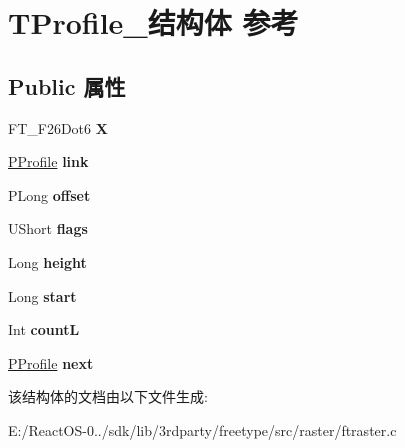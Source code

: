 \hypertarget{struct_t_profile__}{}\section{T\+Profile\+\_\+结构体 参考}
\label{struct_t_profile__}
\subsection*{Public 属性}
\begin{DoxyCompactItemize}
\item 
\mbox{\label{struct_t_profile___a60a3afad98842d916f4f1f4ce9817c9b}} 
F\+T\+\_\+\+F26\+Dot6 {\bfseries X}
\item 
\mbox{\label{struct_t_profile___ada0025f5d3e2dc41f1532f12d876e527}} 
\hyperlink{struct_t_profile__}{P\+Profile} {\bfseries link}
\item 
\mbox{\label{struct_t_profile___ad0a94720cc9f7075b405215481fcabf1}} 
P\+Long {\bfseries offset}
\item 
\mbox{\label{struct_t_profile___abad26048a756182d91d6b9e2b0a43fee}} 
U\+Short {\bfseries flags}
\item 
\mbox{\label{struct_t_profile___aab3018b50c1a1e1cdc1951cbd5198c1f}} 
Long {\bfseries height}
\item 
\mbox{\label{struct_t_profile___a9f25836984cbf9f93fd77afcb11ea1d3}} 
Long {\bfseries start}
\item 
\mbox{\label{struct_t_profile___aa40ba7c241fa1fbdbc84222cb157e228}} 
Int {\bfseries countL}
\item 
\mbox{\label{struct_t_profile___a3202d0919ea1f8b982356c81dbe89456}} 
\hyperlink{struct_t_profile__}{P\+Profile} {\bfseries next}
\end{DoxyCompactItemize}


该结构体的文档由以下文件生成\+:\begin{DoxyCompactItemize}
\item 
E\+:/\+React\+O\+S-\/0../sdk/lib/3rdparty/freetype/src/raster/ftraster.\+c\end{DoxyCompactItemize}
